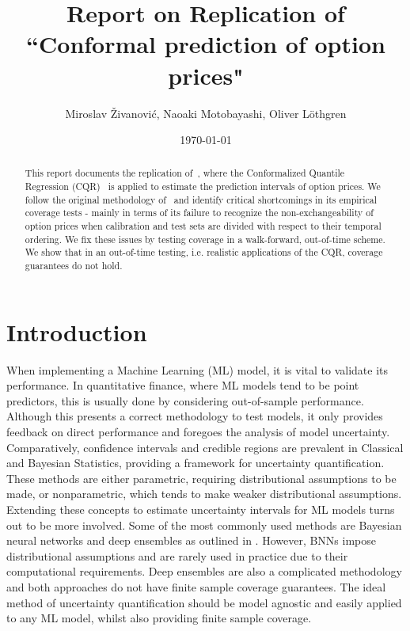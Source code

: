 \documentclass{article}
\title{Report on Replication of ``Conformal prediction of option prices"}
\author{Miroslav Živanović, Naoaki Motobayashi, Oliver Löthgren}
\date{\today}
\theoremstyle{definition}
\begin{document}
\maketitle

\begin{abstract}
    This report documents the replication of~\cite{bastos}, where the Conformalized Quantile Regression (CQR)~\cite{cqr} is applied to estimate the prediction intervals of option prices. We follow the original methodology of~\cite{bastos} and identify critical shortcomings in its empirical coverage tests - mainly in terms of its failure to recognize the non-exchangeability of option prices when calibration and test sets are divided with respect to their temporal ordering. We fix these issues by testing coverage in a walk-forward, out-of-time scheme. We show that in an out-of-time testing, i.e. realistic applications of the CQR, coverage guarantees do not hold. 
\end{abstract}

\tableofcontents

\section{Introduction}
When implementing a Machine Learning (ML) model, it is vital to validate its performance. In quantitative finance, where ML models tend to be point predictors, this is usually done by considering out-of-sample performance. Although this presents a correct methodology to test models, it only provides feedback on direct performance and foregoes the analysis of model uncertainty. Comparatively, confidence intervals and credible regions are prevalent in Classical and Bayesian Statistics, providing a framework for uncertainty quantification. These methods are either parametric, requiring distributional assumptions to be made, or nonparametric, which tends to make weaker distributional assumptions. Extending these concepts to estimate uncertainty intervals for ML models turns out to be more involved. Some of the most commonly used methods are Bayesian neural networks and deep ensembles as outlined in \cite{wutte}. However, BNNs impose distributional assumptions and are rarely used in practice due to their computational requirements. Deep ensembles are also a complicated methodology and both approaches do not have finite sample coverage guarantees. The ideal method of uncertainty quantification should be model agnostic and easily applied to any ML model, whilst also providing finite sample coverage.
\end{document}
